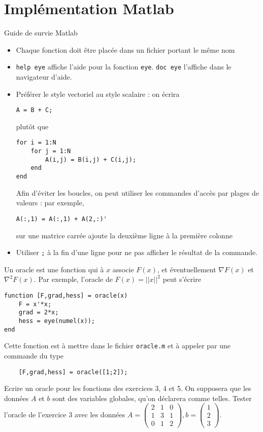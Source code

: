 \documentclass[12pt,a4paper,fleqn]{report}
\begin{document}
\section{Implémentation Matlab}
Guide de survie Matlab
\begin{itemize}
\item Chaque fonction doit être placée dans un fichier portant le même
  nom
\item \verb+help eye+ affiche l'aide pour la fonction
  \verb+eye+. \verb+doc eye+ l'affiche dans le navigateur d'aide.
\item Préférer le style vectoriel au style scalaire : on écrira
\begin{verbatim}
A = B + C;
\end{verbatim} plutôt que
\pagebreak
\begin{verbatim}
for i = 1:N
    for j = 1:N
        A(i,j) = B(i,j) + C(i,j);
    end
end
\end{verbatim}

  Afin d'éviter les boucles, on peut utiliser les commandes d'accès
  par plages de valeurs : par exemple,
\begin{verbatim}
A(:,1) = A(:,1) + A(2,:)'
\end{verbatim}
 sur une matrice carrée ajoute la deuxième ligne à la
  première colonne
\item Utiliser \verb+;+ à la fin d'une ligne pour ne pas afficher le
  résultat de la commande.
\end{itemize}

\begin{exercice}
  Un oracle est une fonction qui à $x$ associe $F(x)$, et
  éventuellement $\nabla F(x)$ et $\nabla^{2} F(x)$. Par exemple,
  l'oracle de $F(x) = ||x||^{2}$ peut s'écrire
\begin{verbatim}
function [F,grad,hess] = oracle(x)
    F = x'*x;
    grad = 2*x;
    hess = eye(numel(x));
end
\end{verbatim}

Cette fonction est à mettre dans le fichier \verb+oracle.m+ et à
appeler par une commande du type
\begin{verbatim}
    [F,grad,hess] = oracle([1;2]);
\end{verbatim}

Ecrire un oracle pour les fonctions des exercices 3, 4 et 5. On
supposera que les données $A$ et $b$ sont des variables globales,
qu'on déclarera comme telles. Tester l'oracle de l'exercice 3 avec les
données $A = \begin{pmatrix}2&1&0\\1&3&1\\0&1&2\end{pmatrix}, b
= \begin{pmatrix}1\\2\\3\end{pmatrix}$.
\end{exercice}
\end{document}
